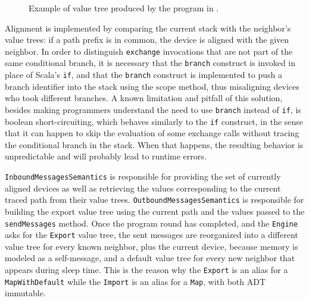 

\begin{figure}
    \centering
    \caption{Example of value tree produced by the program in .}
    \label{fig:value-tree-example}
    \bigskip
    \resizebox{0.5\linewidth}{!}{
        
    }
\end{figure}

Alignment is implemented by comparing the current stack with the neighbor's value trees: if a path prefix is in common, the device is aligned with the given neighbor.
%
In order to distinguish \texttt{exchange} invocations that are not part of the same conditional branch, it is necessary that the \texttt{branch} construct is invoked in place of Scala's \texttt{if}, and that the \texttt{branch} construct is implemented to push a branch identifier into the stack using the scope method, thus misaligning devices who took different branches.
%
A known limitation and pitfall of this solution, besides making programmers understand the need to use \texttt{branch} instead of \texttt{if}, is boolean short-circuiting, which behaves similarly to the \texttt{if} construct, in the sense that it can happen to skip the evaluation of some exchange calls without tracing the conditional branch in the stack.
%
When that happens, the resulting behavior is unpredictable and will probably lead to runtime errors.

\texttt{InboundMessagesSemantics} is responsible for providing the set of currently aligned devices as well as retrieving the values corresponding to the current traced path from their value trees.
%
\texttt{OutboundMessagesSemantics} is responsible for building the export value tree using the current path and the values passed to the \texttt{sendMessages} method.
%
Once the program round has completed, and the \texttt{Engine} asks for the \texttt{Export} value tree, the sent messages are reorganized into a different value tree for every known neighbor, plus the current device, because memory is modeled as a self-message, and a default value tree for every new neighbor that appears during sleep time.
%
This is the reason why the \texttt{Export} is an alias for a \texttt{MapWithDefault} while the \texttt{Import} is an alias for a \texttt{Map}, with both \ac{ADT} immutable.

